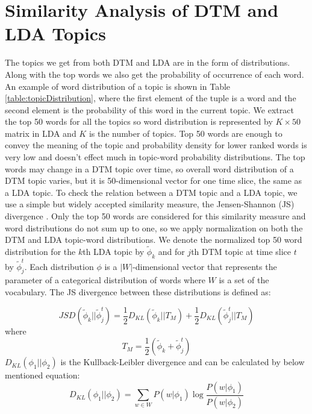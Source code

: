 \documentclass[a4paper]{report}
\begin{document}
\chapter{Similarity Analysis of DTM and LDA Topics}
The topics we get from both DTM and LDA are in the form of distributions. Along with the top words we also get the probability of occurrence of each word. An example of word distribution of a topic is shown in Table \ref{table:topicDistribution}, where the first element of the tuple is a word and the second element is the probability of this word in the current topic. We extract the top 50 words for all the topics so word distribution is represented by $K \times 50$ matrix in LDA and $K$ is the number of topics. Top 50 words are enough to convey the meaning of the topic and probability density for lower ranked words is very low and doesn't effect much in topic-word probability distributions. The top words may change in a DTM topic over time, so overall word distribution of a DTM topic varies, but it is 50-dimensional vector for one time slice, the same as a LDA topic. To check the relation between a DTM topic and a LDA topic, we use a simple but widely accepted similarity measure, the Jensen-Shannon (JS) divergence \cite{lin1991divergence}. Only the top 50 words are considered for this similarity measure and word distributions do not sum up to one, so we apply normalization on both the DTM and LDA topic-word distributions. 
We denote the normalized top 50 word distribution for the $k$th LDA topic by $\tilde{\phi}_{k}$ and for $j$th DTM topic at time slice $t$ by $\tilde{\phi}_j^t$. Each distribution $\phi$ is a $|W|$-dimensional vector that represents the parameter of a categorical distribution of words where $W$ is a set of the vocabulary. 
The JS divergence between these distributions is defined as:

\begin{equation}
JSD(\tilde{\phi}_k || \tilde{\phi}_j^t) = \frac{1}{2} D_{KL}(\tilde{\phi}_k || T_{M}) + \frac{1}{2} D_{KL}(\tilde{\phi}_j^t || T_{M})
\label{eq:jsd}
 \end{equation}
 where
 \begin{equation}
  T_M = \frac{1}{2}(\tilde{\phi}_k + \tilde{\phi}_j^t)
 \end{equation}
 $D_{KL}(\phi_1 || \phi_2)$ is the Kullback-Leibler divergence and can be calculated by below mentioned equation:
 \begin{equation}
D_{KL}(\phi_1 || \phi_2)  =  \sum_{w \in W} P(w| \phi_1) \log \frac{P(w| \phi_1)}{P(w| \phi_2)}
 \end{equation}
\end{document}
